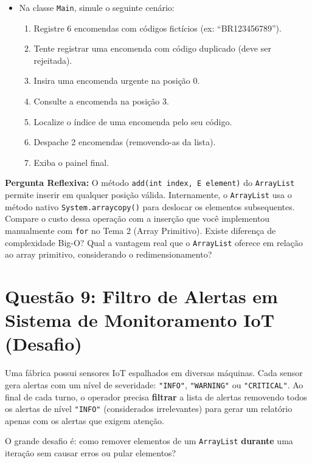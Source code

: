 \documentclass[12pt, a4paper]{article}
\begin{document}
\begin{itemize}
    \item Na classe \texttt{Main}, simule o seguinte cenário:
    \begin{enumerate}
        \item Registre 6 encomendas com códigos fictícios (ex: ``BR123456789'').
        \item Tente registrar uma encomenda com código duplicado (deve ser rejeitada).
        \item Insira uma encomenda urgente na posição 0.
        \item Consulte a encomenda na posição 3.
        \item Localize o índice de uma encomenda pelo seu código.
        \item Despache 2 encomendas (removendo-as da lista).
        \item Exiba o painel final.
    \end{enumerate}
\end{itemize}

\textbf{Pergunta Reflexiva:} O método \texttt{add(int index, E element)} do \texttt{ArrayList} permite inserir em qualquer posição válida. Internamente, o \texttt{ArrayList} usa o método nativo \texttt{System.arraycopy()} para deslocar os elementos subsequentes. Compare o custo dessa operação com a inserção que você implementou manualmente com \texttt{for} no Tema 2 (Array Primitivo). Existe diferença de complexidade Big-O? Qual a vantagem real que o \texttt{ArrayList} oferece em relação ao array primitivo, considerando o redimensionamento?

\vspace{0.2cm}

\section*{Questão 9: Filtro de Alertas em Sistema de Monitoramento IoT (Desafio)}
Uma fábrica possui sensores IoT espalhados em diversas máquinas. Cada sensor gera alertas com um nível de severidade: \texttt{"INFO"}, \texttt{"WARNING"} ou \texttt{"CRITICAL"}. Ao final de cada turno, o operador precisa \textbf{filtrar} a lista de alertas removendo todos os alertas de nível \texttt{"INFO"} (considerados irrelevantes) para gerar um relatório apenas com os alertas que exigem atenção.

O grande desafio é: como remover elementos de um \texttt{ArrayList} \textbf{durante} uma iteração sem causar erros ou pular elementos?
\end{document}
